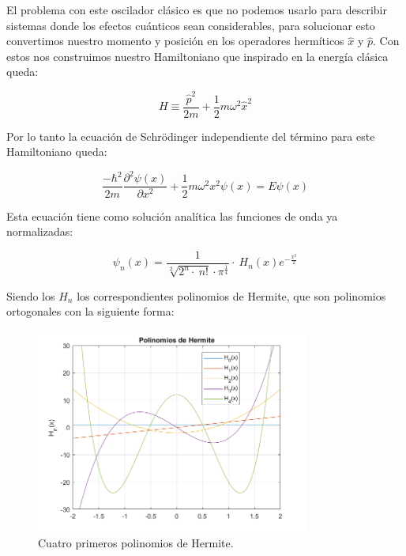 \documentclass[12pt]{article}
\begin{document}
    El problema con este oscilador clásico es que no podemos usarlo para describir sistemas donde los efectos cuánticos sean considerables,
    para solucionar esto convertimos nuestro momento y posición en los operadores hermíticos $\hat{x}$ y $\hat{p}$. Con estos nos construimos nuestro Hamiltoniano que inspirado en la energía clásica queda:
    
    \begin{equation}
    H\equiv \frac{\hat{p}^2}{2m} + \frac{1}{2}m\omega^2\hat{x}^2
    \end{equation}
    
    Por lo tanto la ecuación de Schrödinger independiente del término para este Hamiltoniano queda:
    
    \begin{equation}
        \frac{-\hbar^2}{2m}\frac{\partial^2\psi(x)}{\partial x^2} + \frac{1}{2}m\omega^2x^2\psi(x)=E\psi(x)
    \end{equation}
    
    Esta ecuación tiene como solución analítica las funciones de onda ya normalizadas:
    
    \begin{equation}
        \psi _n\left(x\right)=\frac{1}{\sqrt[2]{2^n\cdot \:n!}\cdot \pi ^{\frac{1}{4}}}\cdot \:H_n\left(x\right)e^{-\frac{x^2}{2}}
    \end{equation}
    
    Siendo los $H_n$ los correspondientes polinomios de Hermite, que son polinomios ortogonales con la siguiente forma:
    
    \begin{figure}[H]
        \centering
        \includegraphics[width=0.8\textwidth]{fotos/PolinomiosHermite.png}
        \caption{Cuatro primeros polinomios de Hermite.}
        \label{PolinomiosHermite}
    \end{figure}
    
\end{document}
